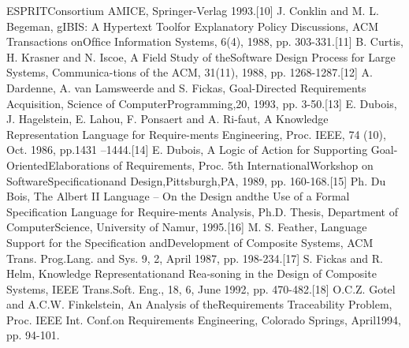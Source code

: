 ESPRITConsortium AMICE, Springer-Verlag 1993.[10] J. Conklin and M. L. Begeman, gIBIS: A Hypertext Toolfor Explanatory Policy Discussions, ACM Transactions onOfﬁce Information Systems, 6(4), 1988, pp. 303-331.[11] B. Curtis, H. Krasner and N. Iscoe, A Field Study of theSoftware Design Process for Large Systems, Communica-tions of the ACM, 31(11), 1988, pp. 1268-1287.[12] A. Dardenne, A. van Lamsweerde and S. Fickas, Goal-Directed Requirements Acquisition, Science of ComputerProgramming,20, 1993, pp. 3-50.[13] E. Dubois, J. Hagelstein, E. Lahou, F. Ponsaert and A. Ri-faut, A Knowledge Representation Language for Require-ments Engineering, Proc. IEEE, 74 (10), Oct. 1986, pp.1431 –1444.[14] E. Dubois, A Logic of Action for Supporting Goal-OrientedElaborations of Requirements, Proc. 5th InternationalWorkshop on SoftwareSpeciﬁcationand Design,Pittsburgh,PA, 1989, pp. 160-168.[15] Ph. Du Bois, The Albert II Language – On the Design andthe Use of a Formal Speciﬁcation Language for Require-ments Analysis, Ph.D. Thesis, Department of ComputerScience, University of Namur, 1995.[16] M. S. Feather, Language Support for the Speciﬁcation andDevelopment of Composite Systems, ACM Trans. Prog.Lang. and Sys. 9, 2, April 1987, pp. 198-234.[17] S. Fickas and R. Helm, Knowledge Representationand Rea-soning in the Design of Composite Systems, IEEE Trans.Soft. Eng., 18, 6, June 1992, pp. 470-482.[18] O.C.Z. Gotel and A.C.W. Finkelstein, An Analysis of theRequirements Traceability Problem, Proc. IEEE Int. Conf.on Requirements Engineering, Colorado Springs, April1994, pp. 94-101.
